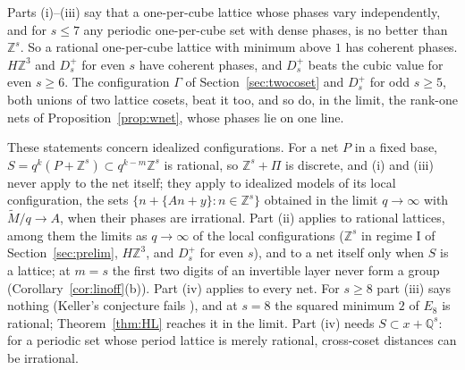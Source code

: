 \documentclass[11pt]{amsart}
\theoremstyle{definition}
\theoremstyle{plain}
\newcommand{\Z}{\mathbb{Z}}
\begin{document}
Parts (i)--(iii) say that a one-per-cube lattice whose phases vary independently, and for $s\le7$ any periodic one-per-cube set with dense phases, is no better than $\Z^s$. So a rational one-per-cube lattice with minimum above $1$ has coherent phases. $H\Z^3$ and $D_s^+$ for even $s$ have coherent phases, and $D_s^+$ beats the cubic value for even $s\ge6$. The configuration $\Gamma$ of Section~\ref{sec:twocoset} and $D_s^+$ for odd $s\ge5$, both unions of two lattice cosets, beat it too, and so do, in the limit, the rank-one nets of Proposition~\ref{prop:wnet}, whose phases lie on one line.

These statements concern idealized configurations. For a net $P$ in a fixed base, $S=q^k(P+\Z^s)\subset q^{k-m}\Z^s$ is rational, so $\Z^s+\Pi$ is discrete, and (i) and (iii) never apply to the net itself; they apply to idealized models of its local configuration, the sets $\{n+\{An+y\}:n\in\Z^s\}$ obtained in the limit $q\to\infty$ with $\tilde M/q\to A$, when their phases are irrational. Part (ii) applies to rational lattices, among them the limits as $q\to\infty$ of the local configurations ($\Z^s$ in regime I of Section~\ref{sec:prelim}, $H\Z^3$, and $D_s^+$ for even $s$), and to a net itself only when $S$ is a lattice; at $m=s$ the first two digits of an invertible layer never form a group (Corollary~\ref{cor:linoff}(b)). Part (iv) applies to every net. For $s\ge8$ part (iii) says nothing (Keller's conjecture fails \cite{LS92,Mac02}), and at $s=8$ the squared minimum $2$ of $E_8$ is rational; Theorem~\ref{thm:HL} reaches it in the limit. Part (iv) needs $S\subset x+\mathbb Q^s$: for a periodic set whose period lattice is merely rational, cross-coset distances can be irrational.
\end{document}
